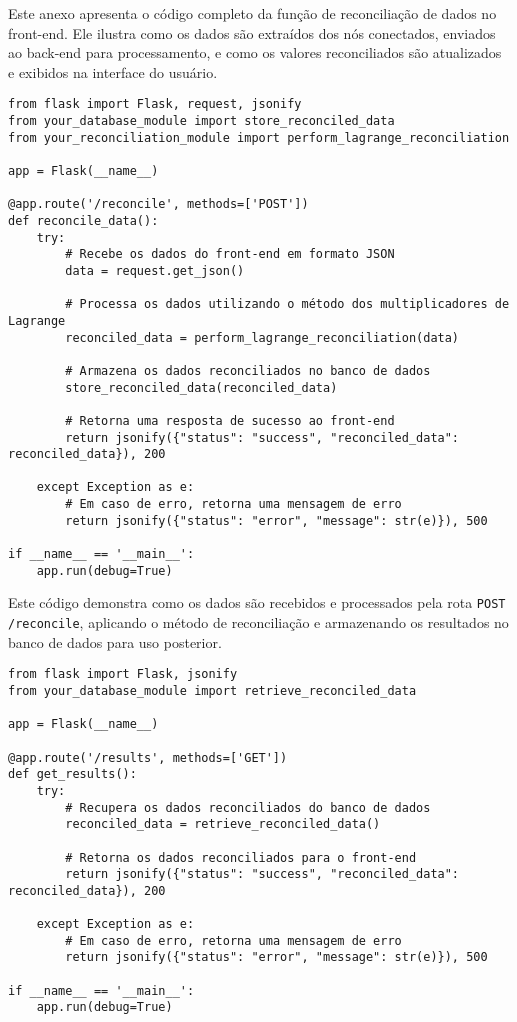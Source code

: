 Este anexo apresenta o código completo da função de reconciliação de dados no front-end. Ele ilustra como os dados são extraídos dos nós conectados, enviados ao back-end para processamento, e como os valores reconciliados são atualizados e exibidos na interface do usuário.


\label{Anexo:CodigoRouteReconcile}

\begin{verbatim}
from flask import Flask, request, jsonify
from your_database_module import store_reconciled_data
from your_reconciliation_module import perform_lagrange_reconciliation

app = Flask(__name__)

@app.route('/reconcile', methods=['POST'])
def reconcile_data():
    try:
        # Recebe os dados do front-end em formato JSON
        data = request.get_json()

        # Processa os dados utilizando o método dos multiplicadores de Lagrange
        reconciled_data = perform_lagrange_reconciliation(data)

        # Armazena os dados reconciliados no banco de dados
        store_reconciled_data(reconciled_data)

        # Retorna uma resposta de sucesso ao front-end
        return jsonify({"status": "success", "reconciled_data": reconciled_data}), 200

    except Exception as e:
        # Em caso de erro, retorna uma mensagem de erro
        return jsonify({"status": "error", "message": str(e)}), 500

if __name__ == '__main__':
    app.run(debug=True)
\end{verbatim}

Este código demonstra como os dados são recebidos e processados pela rota \texttt{POST /reconcile}, aplicando o método de reconciliação e armazenando os resultados no banco de dados para uso posterior.

\label{Anexo:CodigoRouteResults}

\begin{verbatim}
from flask import Flask, jsonify
from your_database_module import retrieve_reconciled_data

app = Flask(__name__)

@app.route('/results', methods=['GET'])
def get_results():
    try:
        # Recupera os dados reconciliados do banco de dados
        reconciled_data = retrieve_reconciled_data()

        # Retorna os dados reconciliados para o front-end
        return jsonify({"status": "success", "reconciled_data": reconciled_data}), 200

    except Exception as e:
        # Em caso de erro, retorna uma mensagem de erro
        return jsonify({"status": "error", "message": str(e)}), 500

if __name__ == '__main__':
    app.run(debug=True)
\end{verbatim}

